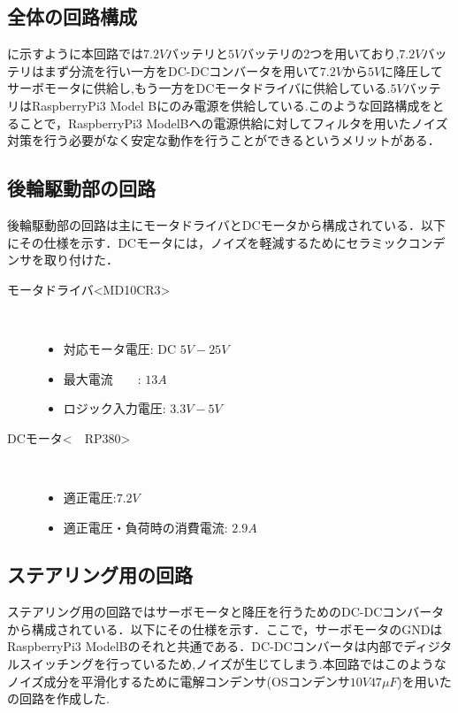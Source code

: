 \subsection{全体の回路構成}

に示すように本回路では$7.2\unit{V}$バッテリと$5\unit{V}$バッテリの2つを用いており,$7.2\unit{V}$バッテリはまず分流を行い一方をDC-DCコンバータを用いて$7.2\unit{V}$から$5\unit{V}$に降圧してサーボモータに供給し,もう一方をDCモータドライバに供給している.$5\unit{V}$バッテリはRaspberryPi3 Model Bにのみ電源を供給している.このような回路構成をとることで，RaspberryPi3    ModelBへの電源供給に対してフィルタを用いたノイズ対策を行う必要がなく安定な動作を行うことができるというメリットがある\cite{motor}．

\subsection{後輪駆動部の回路}
後輪駆動部の回路は主にモータドライバとDCモータから構成されている．以下にその仕様を示す．DCモータには，ノイズを軽減するためにセラミックコンデンサを取り付けた\cite{motor}．
\begin{description}
    \item[モータドライバ\textless MD10CR3\textgreater \cite{motordriver}]\mbox{}\\
    \vspace{-5mm}
        \begin{itemize}
            \item 対応モータ電圧: DC $5\unit{V}-25\unit{V}$
            \item 最大電流　　: $13\unit{A}$
            \item ロジック入力電圧: $3.3\unit{V}-5\unit{V}$
        \end{itemize}
     \item[DCモータ\textless　RP380\textgreater\cite{R380}]\mbox{}\\
     \vspace{-5mm}
         \begin{itemize}
            \item 適正電圧:$7.2\unit{V}$
            \item 適正電圧・負荷時の消費電流: $2.9\unit{A}$
        \end{itemize}
\end{description}

\newpage

\subsection{ステアリング用の回路}
ステアリング用の回路ではサーボモータと降圧を行うためのDC-DCコンバータから構成されている．以下にその仕様を示す．ここで，サーボモータのGNDはRaspberryPi3 ModelBのそれと共通である．DC-DCコンバータは内部でディジタルスイッチングを行っているため,ノイズが生じてしまう\cite{dcdc}.本回路ではこのようなノイズ成分を平滑化するために電解コンデンサ(OSコンデンサ$10\unit{V}47\unit{\mu F}$)を用いたの回路を作成した\cite{dcdcconverter}.


